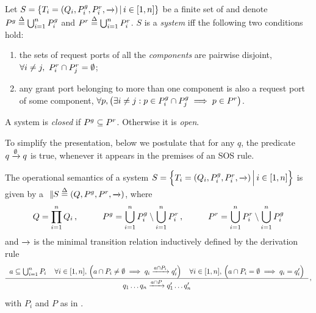 \begin{definition}[System]
  \label{defn:system}
  Let $S = \setdef{T_i = (Q_i, \pin_i, \pout_i, \goesto{})}{i \in [1,n]}$ be
  a finite set of \compmodel{} and denote $\pin \bydef{=} \bigcup_{i=1}^n
  \pin_i$ and $\pout \bydef{=} \bigcup_{i=1}^n \pout_i$.  $S$ is a
  \emph{system} iff the following two conditions hold:
  \begin{enumerate}
  \item the sets of request ports of all the \emph{components} are pairwise
    disjoint, \ie $\forall i \neq j,\ \pout_i \cap \pout_j = \emptyset$;
  \item any grant port belonging to more than one component is also a
    request port of some component, \ie $\forall p, \left(\exists i \neq j:
    p \in \pin_i \cap \pin_j \implies p \in \pout\right)$.
  \end{enumerate}

  A system is \emph{closed} if $\pin \subseteq \pout$.  Otherwise it is
  \emph{open}.
\end{definition}

To simplify the presentation, below we postulate that for any $q$, the
predicate $q \goesto{\emptyset} q$ is true, whenever it appears in the
premises of an SOS rule.

\begin{definition}
  \label{defn:composition}
  The operational semantics of a system $S = \Setdef{T_i = (Q_i, \pin_i,
    \pout_i, \goesto{})}{i \in [1,n]}$ is given by a \compmodel{}
  $\compose[S] \bydef{=} (Q, \pin, \pout, \goesto{})$, where
  \begin{equation}
    \label{eq:composition:ports}
    Q = \prod_{i=1}^n Q_i\,,
    \hspace{1cm}
    \pin = \bigcup_{i=1}^n \pin_i \setminus \bigcup_{i=1}^n \pout_i\,,
    \hspace{1cm}
    \pout = \bigcup_{i=1}^n \pout_i \setminus \bigcup_{i=1}^n \pin_i 
  \end{equation}
  and $\goesto{}$ is the minimal transition relation inductively defined by
  the derivation rule
  \begin{equation}
    \label{eq:composition:transitions}
    \renewcommand{\arraystretch}{1.5}
    \derrule[3]{
      a \subseteq \bigcup_{i=1}^n P_i &
      \forall i \in [1,n],\, \Big(a \cap P_i \neq \emptyset \implies 
        q_i \goesto{a \cap P_i} q_i'\Big) &
      \forall i \in [1,n],\, \Big(a \cap P_i = \emptyset \implies 
        q_i = q_i'\Big) 
    }{
      q_1 \dots q_n \goesto{a \cap P} q_1' \dots q_n'
    }\,,
  \end{equation}
  with $P_i$ and $P$ as in .
\end{definition}

